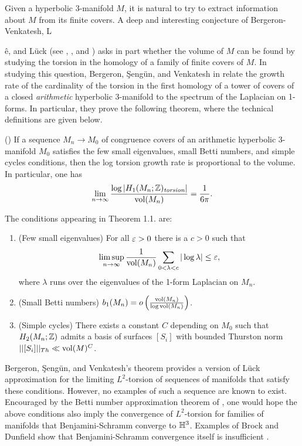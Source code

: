 Given a hyperbolic 3-manifold $M$, it is natural to try to extract information about $M$ from its finite covers. A deep and interesting conjecture of Bergeron-Venkatesh, L{\^{e}, and L\"uck (see \cite{BV}, \cite{thang}, and \cite{wolf}) asks in part whether the volume of $M$ can be found by studying the torsion in the homology of a family of finite covers of $M$. In studying this question, Bergeron, \c Seng\"un, and Venkatesh in \cite{BSV} relate the growth rate of the cardinality of the torsion in the first homology of a tower of covers of a closed \textit{arithmetic} hyperbolic 3-manifold to the spectrum of the Laplacian on 1-forms. In particular, they prove the following theorem, where the technical definitions are given below.

\begin{thm} (\cite{BSV}) If a sequence $M_n\to M_0$ of congruence covers of an arithmetic hyperbolic 3-manifold $M_0$ satisfies the few small eigenvalues, small Betti numbers, and simple cycles conditions, then the log torsion growth rate is proportional to the volume. In particular, one has \[\lim\limits_{n\to\infty} \frac{\log\left|H_1(M_n;{\mathbb Z})_{\emph{torsion}}\right|}{\operatorname{vol}(M_n)} = \frac{1}{6\pi}.\]
\end{thm}


The conditions appearing in Theorem 1.1. are:

\begin{enumerate}
    \item (Few small eigenvalues) For all $\varepsilon>0$ there is a $c>0$ such that $$\limsup_{n\to\infty} \frac{1}{\operatorname{vol}(M_n)}\sum\limits_{0<\lambda<c}|\log\lambda| \leq \varepsilon,$$
where $\lambda$ runs over the eigenvalues of the 1-form Laplacian on $M_n$.

    \item  (Small Betti numbers) $b_1(M_n) = o\left(\frac{\operatorname{vol}(M_n)}{\log \operatorname{vol}(M_n)}\right)$.

    \item (Simple cycles) There exists a constant $C$ depending on $M_0$ such that $H_2(M_n;{\mathbb Z})$ admits a basis of surfaces $[S_i]$ with bounded Thurston norm $||[S_i]||_{Th}\ll \operatorname{vol}(M)^C$.
\end{enumerate}

Bergeron, \c{S}eng\"un, and Venkatesh’s theorem provides a version of L\"uck approximation for the limiting $L^2$-torsion of sequences of manifolds that satisfy these conditions. However, no examples of such a sequence are known to exist. Encouraged by the Betti number approximation theorem of \cite{samurai}, one would hope the above conditions also imply the convergence of $L^2$-torsion for families of manifolds that Benjamini-Schramm converge to $\mathbb H^3$. Examples of Brock and Dunfield show that Benjamini-Schramm convergence itself is insufficient \cite{BDE}.

}
